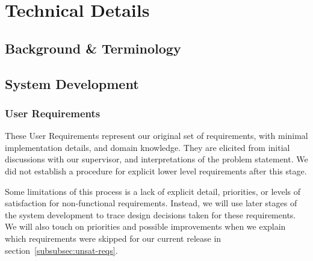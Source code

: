 \documentclass[11pt]{article}
\begin{document}
    \section{Technical Details}\label{sec:technical-details}
    \subsection{Background \& Terminology}\label{subsec:background-&-terminology}

    \subsection{System Development}

    \label{subsec:system-development}
    \subsubsection{User Requirements}\label{subsubsec:user-reqs}

    These User Requirements represent our original set of requirements, with minimal implementation details, and domain knowledge.
    They are elicited from initial discussions with our supervisor,
    and interpretations of the problem statement.
    We did not establish a procedure for explicit lower level requirements after this stage.

    Some limitations of this process is a lack of explicit detail, priorities, or levels of satisfaction for non-functional requirements.
    Instead, we will use later stages of the system development to trace design decisions taken for these requirements.
    We will also touch on priorities and possible improvements when we explain
    which requirements were skipped for our current release in section~\ref{subsubsec:unsat-reqs}.
\end{document}

